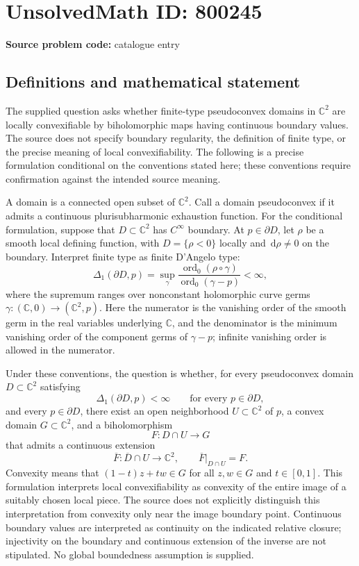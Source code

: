 \documentclass[11pt]{article}
\newcommand{\C}{\mathbb{C}}
\newcommand{\dd}{\,\mathrm{d}}
\begin{document}
\section*{UnsolvedMath ID: 800245}
\textbf{Source problem code:} catalogue entry
\subsection{Definitions and mathematical statement}
The supplied question asks whether finite-type pseudoconvex domains in \(\C^2\) are locally convexifiable by biholomorphic maps having continuous boundary values. The source does not specify boundary regularity, the definition of finite type, or the precise meaning of local convexifiability. The following is a precise formulation conditional on the conventions stated here; these conventions require confirmation against the intended source meaning.

A domain is a connected open subset of \(\C^2\). Call a domain pseudoconvex if it admits a continuous plurisubharmonic exhaustion function. For the conditional formulation, suppose that \(D\subset\C^2\) has \(C^\infty\) boundary. At \(p\in\partial D\), let \(\rho\) be a smooth local defining function, with \(D=\{\rho<0\}\) locally and \(\dd\rho\ne0\) on the boundary. Interpret finite type as finite D'Angelo type:
\[
\Delta_1(\partial D,p)
=\sup_{\gamma}\frac{\operatorname{ord}_0(\rho\circ\gamma)}{\operatorname{ord}_0(\gamma-p)}<\infty,
\]
where the supremum ranges over nonconstant holomorphic curve germs \(\gamma:(\C,0)\to(\C^2,p)\). Here the numerator is the vanishing order of the smooth germ in the real variables underlying \(\C\), and the denominator is the minimum vanishing order of the component germs of \(\gamma-p\); infinite vanishing order is allowed in the numerator.

Under these conventions, the question is whether, for every pseudoconvex domain \(D\subset\C^2\) satisfying
\[
\Delta_1(\partial D,p)<\infty\qquad\text{for every }p\in\partial D,
\]
and every \(p\in\partial D\), there exist an open neighborhood \(U\subset\C^2\) of \(p\), a convex domain \(G\subset\C^2\), and a biholomorphism
\[
F:D\cap U\longrightarrow G
\]
that admits a continuous extension
\[
\overline F:\overline D\cap U\longrightarrow\C^2,
\qquad \overline F|_{D\cap U}=F.
\]
Convexity means that \((1-t)z+tw\in G\) for all \(z,w\in G\) and \(t\in[0,1]\). This formulation interprets local convexifiability as convexity of the entire image of a suitably chosen local piece. The source does not explicitly distinguish this interpretation from convexity only near the image boundary point. Continuous boundary values are interpreted as continuity on the indicated relative closure; injectivity on the boundary and continuous extension of the inverse are not stipulated. No global boundedness assumption is supplied.
\end{document}
